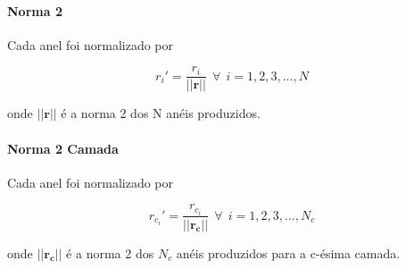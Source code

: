 %
%
%
%
%



\paragraph{Norma 2}
\label{par:norm2}

Cada anel foi normalizado por

\begin{equation}
r_{i}' = \frac{r_i}{||\mathbf{r}||}~~\forall~~i=1,2,3,...,N
\end{equation}

\noindent onde $||\mathbf{r}||$ é a norma 2 dos N anéis produzidos.

\paragraph{Norma 2 Camada}
\label{par:norm_camada}

Cada anel foi normalizado por

\begin{equation}
r_{c_i}' = \frac{r_{c_i}}{||\mathbf{r_c}||}~~\forall~~i=1,2,3,...,N_c
\end{equation}

\noindent onde $||\mathbf{r_c}||$ é a norma 2 dos $N_c$ anéis produzidos para a
c-ésima camada.

